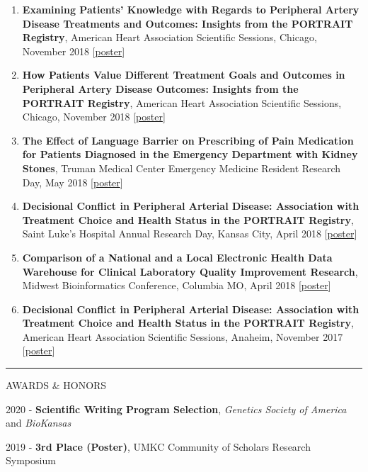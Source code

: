 \documentclass[
]{article}
\begin{document}
\begin{enumerate}
\item
  \textbf{Examining Patients' Knowledge with Regards to Peripheral
  Artery Disease Treatments and Outcomes: Insights from the PORTRAIT
  Registry}, American Heart Association Scientific Sessions, Chicago,
  November 2018
  {[}\href{https://jeremyprovance.github.io/assets/2018-11-10_Poster2.pdf}{poster}{]}
\item
  \textbf{How Patients Value Different Treatment Goals and Outcomes in
  Peripheral Artery Disease Outcomes: Insights from the PORTRAIT
  Registry}, American Heart Association Scientific Sessions, Chicago,
  November 2018
  {[}\href{https://jeremyprovance.github.io/assets/2018-11-10_Poster.pdf}{poster}{]}
\item
  \textbf{The Effect of Language Barrier on Prescribing of Pain
  Medication for Patients Diagnosed in the Emergency Department with
  Kidney Stones}, Truman Medical Center Emergency Medicine Resident
  Research Day, May 2018
  {[}\href{https://jeremyprovance.github.io/assets/Ottman_Poster.pdf}{poster}{]}
\item
  \textbf{Decisional Conflict in Peripheral Arterial Disease:
  Association with Treatment Choice and Health Status in the PORTRAIT
  Registry}, Saint Luke's Hospital Annual Research Day, Kansas City,
  April 2018
  {[}\href{https://jeremyprovance.github.io/assets/2017-11-11_Poster.pdf}{poster}{]}
\item
  \textbf{Comparison of a National and a Local Electronic Health Data
  Warehouse for Clinical Laboratory Quality Improvement Research},
  Midwest Bioinformatics Conference, Columbia MO, April 2018
  {[}\href{https://jeremyprovance.github.io/assets/2018-04-11_Poster.pdf}{poster}{]}
\item
  \textbf{Decisional Conflict in Peripheral Arterial Disease:
  Association with Treatment Choice and Health Status in the PORTRAIT
  Registry}, American Heart Association Scientific Sessions, Anaheim,
  November 2017
  {[}\href{https://jeremyprovance.github.io/assets/2017-11-11_Poster.pdf}{poster}{]}
\end{enumerate}

\begin{center}\rule{0.5\linewidth}{0.5pt}\end{center}

AWARDS \& HONORS

2020 - \textbf{Scientific Writing Program Selection}, \emph{Genetics
Society of America} and \emph{BioKansas}

2019 - \textbf{3rd Place (Poster)}, UMKC Community of Scholars Research
Symposium
\end{document}
